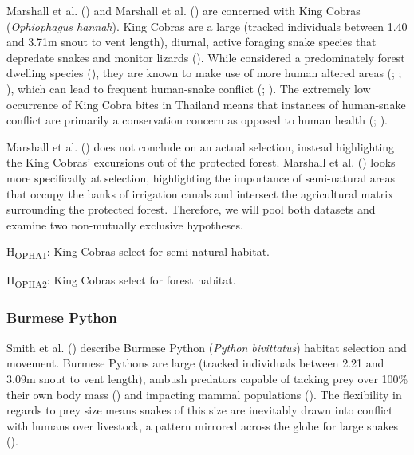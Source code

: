\documentclass[10pt,a4paper]{article}
\begin{document}
Marshall et al. () and Marshall et al. () are concerned with King Cobras (\emph{Ophiophagus hannah}).
King Cobras are a large (tracked individuals between 1.40 and 3.71m snout to vent length), diurnal, active foraging snake species that depredate snakes and monitor lizards ().
While considered a predominately forest dwelling species (), they are known to make use of more human altered areas (; ; ), which can lead to frequent human-snake conflict (; ).
The extremely low occurrence of King Cobra bites in Thailand means that instances of human-snake conflict are primarily a conservation concern as opposed to human health (; ).

Marshall et al. () does not conclude on an actual selection, instead highlighting the King Cobras' excursions out of the protected forest.
Marshall et al. () looks more specifically at selection, highlighting the importance of semi-natural areas that occupy the banks of irrigation canals and intersect the agricultural matrix surrounding the protected forest.
Therefore, we will pool both datasets and examine two non-mutually exclusive hypotheses.

H\textsubscript{OPHA1}: King Cobras select for semi-natural habitat.

H\textsubscript{OPHA2}: King Cobras select for forest habitat.

\subsubsection{Burmese Python}\label{burmese-python}

Smith et al. () describe Burmese Python (\emph{Python bivittatus}) habitat selection and movement.
Burmese Pythons are large (tracked individuals between 2.21 and 3.09m snout to vent length), ambush predators capable of tacking prey over 100\% their own body mass () and impacting mammal populations ().
The flexibility in regards to prey size means snakes of this size are inevitably drawn into conflict with humans over livestock, a pattern mirrored across the globe for large snakes ().
\end{document}
